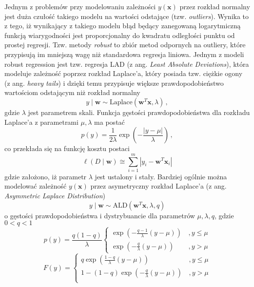 \documentclass{myclass}
\begin{document}
Jednym z problemów przy modelowaniu zależności \(y(\mathbf{x})\) przez rozkład normalny jest duża
czułość takiego modelu na wartości odstające (tzw. \textit{outliers}). Wynika to z tego, iż
wynikający z takiego modelu błąd będący zanegowaną logarytmiczną funkcją wiarygodności jest
proporcjonalny do kwadratu odległości punktu od prostej regresji. Tzw. metody \textit{robust} to
zbiór metod odpornych na outliery, które przypisują im mniejszą wagę niż standardowa regresja
liniowa. Jednym z modeli robust regression jest tzw. regresja LAD (z ang. \textit{Least Absolute
Deviations}), która modeluje zależność poprzez rozkład Laplace'a, który posiada tzw. ciężkie ogony
(z ang. \textit{heavy tails}) i dzięki temu przypisuje większe prawdopodobieństwo wartościom
odstającym niż rozkład normalny
\begin{equation*}
    y \mid \mathbf{w} \sim \text{Laplace}(\mathbf{w}^T\mathbf{x}, \lambda)\,,
\end{equation*}
gdzie \(\lambda\) jest parametrem skali. Funkcja gęstości prawdopodobieństwa dla rozkładu Laplace'a
z parametrami \(\mu, \lambda\) ma postać
\begin{equation*}
    p(y) = \frac{1}{2\lambda} \exp\left(-\frac{|y - \mu|}{\lambda}\right)\,,
\end{equation*}
co przekłada się na funkcję kosztu postaci
\begin{equation*}
    \ell(D \mid \mathbf{w}) \cong \sum_{i=1}^m |y_i - \mathbf{w}^T\mathbf{x}_i|
\end{equation*}
gdzie założono, iż parametr \(\lambda\) jest ustalony i stały. Bardziej ogólnie można modelować
zależność \(y(\mathbf{x})\) przez asymetryczny rozkład Laplace'a (z ang. \textit{Asymmetric Laplace
Distribution})
\begin{equation*}
    y \mid \mathbf{w} \sim \text{ALD}(\mathbf{w}^T\mathbf{x}, \lambda, q)
\end{equation*}
o gęstości prawdopodobieństwa i dystrybuancie dla parametrów \(\mu, \lambda, q\), gdzie \(0 < q <
1\)
\begin{equation*}
    p(y) = \frac{q(1-q)}{\lambda}\begin{cases}
    \exp\left(-\frac{q-1}{\lambda}(y - \mu)\right)&\,,\text{\(y \leq \mu\)}\\
    \exp\left(-\frac{q}{\lambda}(y-\mu)\right)&\,,\text{\(y > \mu\)}
    \end{cases}
\end{equation*}
\begin{equation*}
    F(y) = \begin{cases}
        q \exp\left(\frac{1-q}{\lambda}(y-\mu)\right)&\,,\text{\(y \leq \mu\)}\\
        1 - (1-q)\exp\left(-\frac{q}{\lambda}(y-\mu)\right)&\,,\text{\(y > \mu\)}\\
    \end{cases}
\end{equation*}
\end{document}

